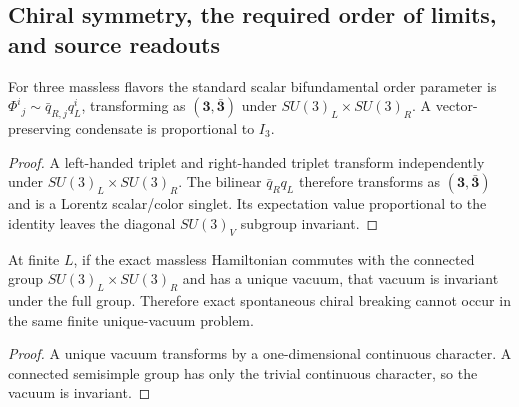 \documentclass[12pt,a4paper]{article}
\begin{document}
\subsection{Chiral symmetry, the required order of limits, and source readouts}
\label{p10:sec:chiral-symmetry-breaking}

\begin{proposition}
\label{p10:prop:minimal-scalar-singlet-order-parameter}
For three massless flavors the standard scalar bifundamental order parameter is
\(\Phi^i{}_j\sim\bar q_{R,j}q_L^i\), transforming as \((\mathbf3,\bar{\mathbf3})\) under \(SU(3)_L\times SU(3)_R\).  A vector-preserving condensate is proportional to \(I_3\).
\end{proposition}
\begin{proof}
A left-handed triplet and right-handed triplet transform independently under $SU(3)_L\times SU(3)_R$.  The bilinear $\bar q_R q_L$ therefore transforms as $(\mathbf3,\bar{\mathbf3})$ and is a Lorentz scalar/color singlet.  Its expectation value proportional to the identity leaves the diagonal $SU(3)_V$ subgroup invariant.
\end{proof}

\begin{theorem}
\label{p10:thm:vector-flavor-vacuum-preservation}
At finite \(L\), if the exact massless Hamiltonian commutes with the connected group \(SU(3)_L\times SU(3)_R\) and has a unique vacuum, that vacuum is invariant under the full group.  Therefore exact spontaneous chiral breaking cannot occur in the same finite unique-vacuum problem.
\end{theorem}
\begin{proof}
A unique vacuum transforms by a one-dimensional continuous character.  A connected semisimple group has only the trivial continuous character, so the vacuum is invariant.
\end{proof}
\end{document}
